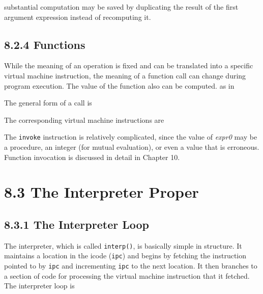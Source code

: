 \noindent substantial computation may be saved by duplicating the
result of the first argument expression instead of recomputing it.

\subsection[8.2.4 Functions]{8.2.4 Functions}

While the meaning of an operation is fixed and can be translated into
a specific virtual machine instruction, the meaning of a function call
can change during program execution. The value of the function also
can be computed. as in


The general form of a call is

The corresponding virtual machine instructions are

\goodbreak
{}

The \texttt{invoke} instruction is relatively complicated, since the
value of \textit{expr0 }may be a procedure, an integer (for mutual
evaluation), or even a value that is erroneous. Function invocation is
discussed in detail in Chapter 10.

\section[8.3 The Interpreter Proper]{8.3 The Interpreter Proper}
\subsection[8.3.1 The Interpreter Loop]{8.3.1 The Interpreter Loop}

The interpreter, which is called \texttt{interp()}, is basically
simple in structure. It maintains a location in the icode
(\texttt{ipc}) and begins by fetching the instruction pointed to by
\texttt{ipc} and incrementing \texttt{ipc} to the next location. It
then branches to a section of code for processing the virtual machine
instruction that it fetched. The interpreter loop is

